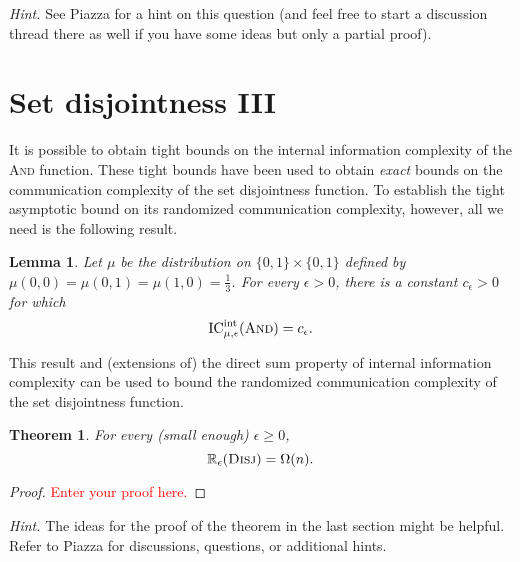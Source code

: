 \documentclass[11pt]{amsart}
\theoremstyle{plain}
\newtheorem{theorem}{Theorem}
\newtheorem{lemma}{Lemma}
\theoremstyle{definition}
\theoremstyle{plain}
\newcommand{\Disj}{\textsc{Disj}}
\newcommand{\ICint}{\mathrm{IC}^{\mathrm{int}}}
\newcommand{\R}{\mathbb{R}}
\newcommand{\replacethistext}[1]{\textcolor{red}{#1}}
\begin{document}
\bigskip
\noindent \emph{Hint.} See Piazza for a hint on this question (and feel free to start a discussion thread there as well if you have some ideas but only a partial proof).


\newpage 
\section{Set disjointness III}

It is possible to obtain tight bounds on the internal information complexity of the \textsc{And} function. These tight bounds have been used to obtain \emph{exact} bounds on the communication complexity of the set disjointness function. To establish the tight asymptotic bound on its randomized communication complexity, however, all we need is the following result.

\begin{lemma}
Let $\mu$ be the distribution on $\{0,1\} \times \{0,1\}$ defined by $\mu(0,0) = \mu(0,1) = \mu(1,0) = \frac13$.
For every $\epsilon > 0$, there is a constant $c_\epsilon > 0$ for which
\[
\ICint_{\mu,\epsilon}(\textsc{And}) = c_\epsilon.
\]
\end{lemma}

This result and (extensions of) the direct sum property of internal information complexity can be used to bound the randomized communication complexity of the set disjointness function.

\begin{theorem}
For every (small enough) $\epsilon \ge 0$, 
\[
\R_\epsilon(\Disj) = \Omega(n).
\]
\end{theorem}

\begin{proof}
\replacethistext{Enter your proof here.}
\end{proof}

\bigskip
\noindent \emph{Hint.} The ideas for the proof of the theorem in the last section might be helpful. Refer to Piazza for discussions, questions, or additional hints.
\end{document}

